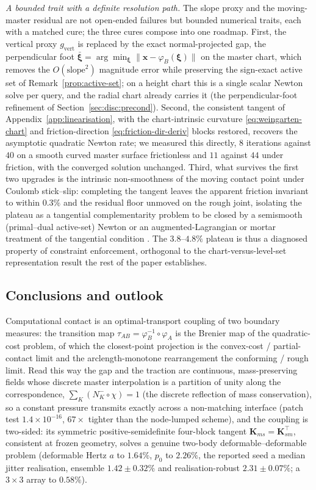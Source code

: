 \documentclass{svjour3}                 %
\newcommand{\norm}[1]{\lVert#1\rVert}
\newcommand{\xbf}{\bm{x}}
\newcommand{\tmap}{\tau_{AB}}
\newcommand{\map}[1]{\varphi_{#1}}
\begin{document}
\emph{A bounded trait with a definite resolution path.} The slope proxy and the moving-master residual are not
open-ended failures but bounded numerical traits, each with a matched cure; the three cures compose into one
roadmap. First, the vertical proxy $g_{\mathrm{vert}}$ is replaced by the exact normal-projected gap, the
perpendicular foot $\bar{\bm\xi}=\arg\min_{\bm\xi}\norm{\xbf-\map{B}(\bm\xi)}$ on the master chart, which removes
the $O(\text{slope}^2)$ magnitude error while preserving the sign-exact active set of
Remark~\ref{prop:active-set}; on a height chart this is a single scalar Newton solve per query, and the radial
chart already carries it (the perpendicular-foot refinement of Section~\ref{sec:disc:precond}). Second, the
consistent tangent of Appendix~\ref{app:linearisation}, with the chart-intrinsic curvature
\eqref{eq:weingarten-chart} and friction-direction \eqref{eq:friction-dir-deriv} blocks restored, recovers the
asymptotic quadratic Newton rate; we measured this directly, $8$ iterations against $40$ on a smooth curved
master surface frictionless and $11$ against $44$ under friction, with the converged solution unchanged. Third,
what survives the first two upgrades is the intrinsic non-smoothness of the moving contact point under Coulomb
stick--slip: completing the tangent leaves the apparent friction invariant to within $0.3\%$ and the residual
floor unmoved on the rough joint, isolating the plateau as a tangential complementarity problem to be closed by
a semismooth (primal--dual active-set) Newton or an augmented-Lagrangian or mortar treatment of the tangential
condition \citep{alart1991mixed,simo1992augmented,puso2004mortar,chouly2013nitsche}. The $3.8$--$4.8\%$ plateau
is thus a diagnosed property of constraint enforcement, orthogonal to the chart-versus-level-set representation
result the rest of the paper establishes.

\subsection{Conclusions and outlook}\label{sec:disc:concl}

Computational contact is an optimal-transport coupling of two boundary measures: the transition map
$\tmap=\map{B}^{-1}\circ\map{A}$ is the Brenier map of the quadratic-cost problem, of which the closest-point
projection is the convex-cost / partial-contact limit and the arclength-monotone rearrangement the conforming /
rough limit. Read this way the gap and the traction are continuous, mass-preserving fields whose discrete master
interpolation is a partition of unity along the correspondence, $\sum_K(N_K^-\!\circ\chi)=1$ (the discrete
reflection of mass conservation), so a constant pressure
transmits exactly across a non-matching interface (patch test $1.4\times10^{-16}$, $67\times$ tighter than the
node-lumped scheme), and the coupling is two-sided: its symmetric positive-semidefinite four-block tangent
$\bm K_{ms}=\bm K_{sm}^{\top}$, consistent at frozen geometry, solves a genuine two-body deformable--deformable
problem (deformable Hertz $a$ to $1.64\%$, $p_0$ to $2.26\%$, the reported seed a median jitter realisation, ensemble
$1.42\pm0.32\%$ and realisation-robust $2.31\pm0.07\%$; a $3\times3$ array to $0.58\%$).
\end{document}
